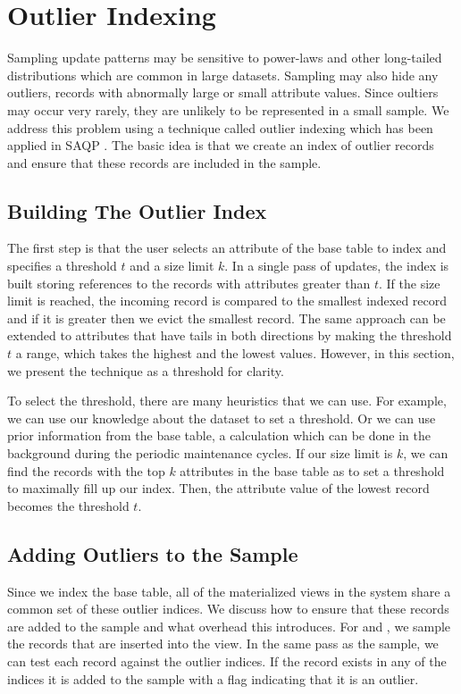 \section{Outlier Indexing}\label{outlier}
Sampling update patterns may be sensitive to power-laws and other long-tailed distributions which are common in large datasets\cite{clauset2009power}.
Sampling may also hide any outliers, records with abnormally large or small attribute values.
Since oultiers may occur very rarely, they are unlikely to be represented in a small sample. 
We address this problem using a technique called outlier indexing which has been applied in SAQP \cite{chaudhuri2001overcoming}.
The basic idea is that we create an index of outlier records and ensure that these records are included in the sample.

\subsection{Building The Outlier Index}
The first step is that the user selects an attribute of the base table to index and specifies a threshold $t$ and a size limit $k$.
In a single pass of updates, the index is built storing references to the records with attributes greater than $t$.
If the size limit is reached, the incoming record is compared to the smallest indexed record and if it is greater then we evict the smallest record.
The same approach can be extended to attributes that have tails in both directions by making the threshold $t$ a range, which takes the highest and the lowest values.
However, in this section, we present the technique as a threshold for clarity.

To select the threshold, there are many heuristics that we can use.
For example, we can use our knowledge about the dataset to set a threshold.
Or we can use prior information from the base table, a calculation which can be done in the background during the periodic maintenance cycles.
If our size limit is $k$, we can find the records with the top $k$ attributes in the base table as to set a threshold to maximally fill up our index. 
Then, the attribute value of the lowest record becomes the threshold $t$.

\subsection{Adding Outliers to the Sample}
Since we index the base table, all of the materialized views in the system share a common set of these outlier indices.
We discuss how to ensure that these records are added to the sample and what overhead this introduces.
For \spview and \fjview, we sample the records that are inserted into the view.
In the same pass as the sample, we can test each record against the outlier indices. 
If the record exists in any of the indices it is added to the sample with a flag indicating that it is an outlier.

